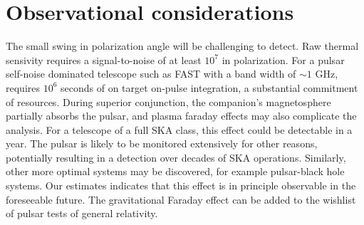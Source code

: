 \documentclass[aps,showpacs,onecolumn,floats,prd,superscriptaddress,nofootinbib]{revtex4}
\begin{document}
\section{Observational considerations}

The small swing in polarization angle will be challenging to detect.
Raw thermal sensivity requires a signal-to-noise of at least $10^7$ in
polarization.  For a pulsar self-noise dominated telescope such as
FAST with a band width of $\sim 1$ GHz, requires $10^6$ seconds of on
target on-pulse integration, a substantial commitment of resources.
During superior conjunction, the companion's magnetosphere partially
absorbs the pulsar, and plasma faraday effects may also complicate the
analysis.  For a telescope of a full SKA class, this effect could be
detectable in a year.  The pulsar is likely to be monitored extensively
for other reasons, potentially resulting in a detection over decades
of SKA operations.  Similarly, other more optimal systems may be
discovered, for example pulsar-black hole systems.  Our estimates
indicates that this effect is in principle observable in the
foreseeable future.  The gravitational Faraday effect can be added to
the wishlist of pulsar tests of general relativity.


\end{document}

